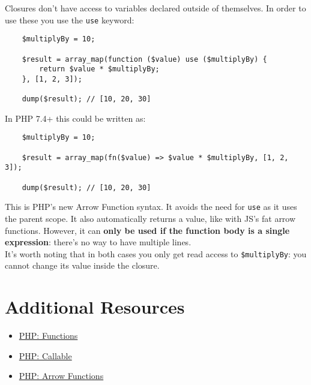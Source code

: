 Closures don't have access to variables declared outside of themselves. In order to use these you use the \texttt{use} keyword:

\begin{verbatim}
    $multiplyBy = 10;

    $result = array_map(function ($value) use ($multiplyBy) {
        return $value * $multiplyBy;
    }, [1, 2, 3]);

    dump($result); // [10, 20, 30]
\end{verbatim}

In PHP 7.4+ this could be written as:

\begin{verbatim}
    $multiplyBy = 10;

    $result = array_map(fn($value) => $value * $multiplyBy, [1, 2, 3]);

    dump($result); // [10, 20, 30]
\end{verbatim}

This is PHP's new Arrow Function syntax. It avoids the need for \texttt{use} as it uses the parent scope. It also automatically returns a value, like with JS's fat arrow functions. However, it can \textbf{only be used if the function body is a single expression}: there's no way to have multiple lines.
\\

It's worth noting that in both cases you only get read access to \texttt{\$multiplyBy}: you cannot change its value inside the closure.



\section{Additional Resources}

\begin{itemize}[leftmargin=*]
    \item \href{http://www.php.net/manual/en/functions.user-defined.php}{PHP: Functions}
    \item \href{http://www.php.net/manual/en/language.types.callable.php}{PHP: Callable}
    \item \href{https://www.php.net/manual/en/functions.arrow.php}{PHP: Arrow Functions}
\end{itemize}
